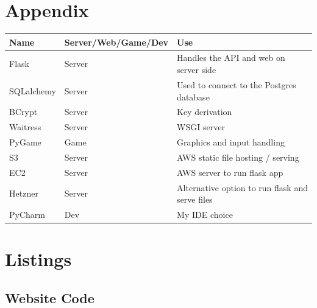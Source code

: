 \documentclass[a4paper, 11pt]{report}
\begin{document}
\section{Appendix}
\begin{table}[h!]
\begin{tabular}{|l|l|l|}
\hline
\rowcolor[HTML]{C0C0C0} 
{\color[HTML]{000000} \textbf{Name}} & {\color[HTML]{000000} \textbf{Server/Web/Game/Dev}} & {\color[HTML]{000000} \textbf{Use}}             \\ \hline
Flask                                & Server                                              & Handles the API and web on server side          \\ \hline
SQLalchemy                           & Server                                              & Used to connect to the Postgres database        \\ \hline
BCrypt                               & Server                                              & Key derivation                                  \\ \hline
Waitress                             & Server                                              & WSGI server                                     \\ \hline
PyGame                               & Game                                                & Graphics and input handling                     \\ \hline
S3                                   & Server                                              & AWS static file hosting / serving               \\ \hline
EC2                                  & Server                                              & AWS server to run flask app                     \\ \hline
Hetzner                              & Server                                              & Alternative option to run flask and serve files \\ \hline
PyCharm                              & Dev                                                 & My IDE choice                                   \\ \hline
\end{tabular}
\end{table}

\section{Listings}
\lstlistoflistings
\subsection{Website Code}
\end{document}
